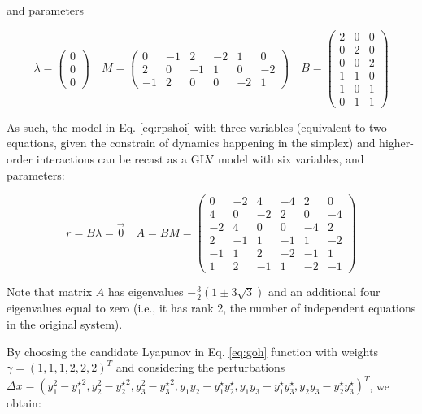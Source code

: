 \documentclass{article}
\begin{document}
and parameters

\begin{equation}
\label{eq:rpshoiqp}
\lambda = \begin{pmatrix}
0\\
0\\
0
\end{pmatrix} \quad 
M = \begin{pmatrix}
0 & -1 & 2 & -2 & 1 & 0\\
2 & 0 & -1 & 1 & 0 & -2\\
-1 & 2 & 0 & 0 & -2 & 1
\end{pmatrix} \quad
B = \begin{pmatrix}
2 & 0 & 0 \\
0 & 2 & 0 \\
0 & 0 & 2 \\
1 & 1 & 0 \\
1 & 0 & 1 \\
0 & 1 & 1
\end{pmatrix}
\end{equation}

As such, the model in Eq. \ref{eq:rpshoi} with three variables
(equivalent to two equations, given the constrain of dynamics happening
in the simplex) and higher-order interactions can be recast as a GLV
model with six variables, and parameters:

\begin{equation}
r = B \lambda = \vec{0}
\quad
A = B M = \begin{pmatrix}
0 & -2 & 4 & -4 & 2 & 0 \\ 
4 & 0 & -2 & 2 & 0 & -4 \\ 
-2 & 4 & 0 & 0 & -4 & 2 \\ 
2 & -1 & 1 & -1 & 1 & -2 \\ 
-1 & 1 & 2 & -2 & -1 & 1 \\ 
1 & 2 & -1 & 1 & -2 & -1
\end{pmatrix}
\end{equation}

Note that matrix \(A\) has eigenvalues
\(-\frac{3}{2}(1 \pm 3 \sqrt{3})\) and an additional four eigenvalues
equal to zero (i.e., it has rank 2, the number of independent equations
in the original system).

By choosing the candidate Lyapunov in Eq. \ref{eq:goh} function with
weights \(\gamma = (1,1,1, 2,2,2)^T\) and considering the perturbations
\(\Delta x = (y_1^2 - {y_1^\star}^2, y_2^2 - {y_2^\star}^2, y_3^2 - {y_3^\star}^2, y_1 y_2 - y_1^\star y_2^\star, y_1 y_3 - y_1^\star y_3^\star, y_2 y_3 - y_2^\star y_3^\star)^T\),
we obtain:
\end{document}
